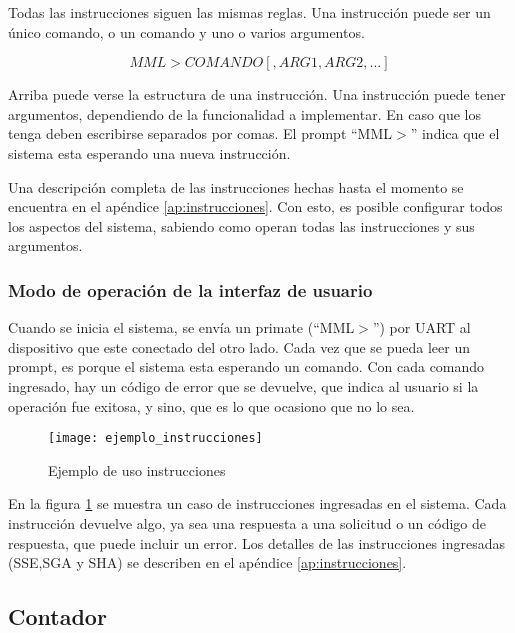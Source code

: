 Todas las instrucciones siguen las mismas reglas. Una instrucci\'on puede ser un \'unico comando, o un comando y uno o varios argumentos.

\begin{equation}
	MML>COMANDO[,ARG1,ARG2,...]
\end{equation}

Arriba puede verse la estructura de una instrucci\'on. Una instrucci\'on puede tener argumentos, dependiendo de la funcionalidad a implementar. En caso que los tenga deben escribirse separados por comas. El prompt ``MML$>$'' indica que el sistema esta esperando una nueva instrucci\'on.

Una descripci\'on completa de las instrucciones hechas hasta el momento se encuentra en el ap\'endice \ref{ap:instrucciones}. Con esto, es posible configurar todos los aspectos del sistema, sabiendo como operan todas las instrucciones y sus argumentos.

\subsubsection{Modo de operaci\'on de la interfaz de usuario} %
\label{ssub:modo_de_operaci\'on_de_la_interfaz_de_usuario}


Cuando se inicia el sistema, se env\'ia un primate (``MML$>$'') por UART al dispositivo que este conectado del otro lado. Cada vez que se pueda leer un prompt, es porque el sistema esta esperando un comando. Con cada comando ingresado, hay un c\'odigo de error que se devuelve, que indica al usuario si la operaci\'on fue exitosa, y sino, que es lo que ocasiono que no lo sea.

\begin{figure}[h]
  \centering
  \texttt{[image: ejemplo\_instrucciones]}
  \caption{Ejemplo de uso instrucciones}\label{fig:instrucciones}
\end{figure}

En la figura \ref{fig:instrucciones} se muestra un caso de instrucciones ingresadas en el sistema. Cada instrucci\'on devuelve algo, ya sea una respuesta a una solicitud o un c\'odigo de respuesta, que puede incluir un error. Los detalles de las instrucciones ingresadas (SSE,SGA y SHA) se describen en el ap\'endice \ref{ap:instrucciones}.


\subsection{Contador} %
\label{sub:contador}

